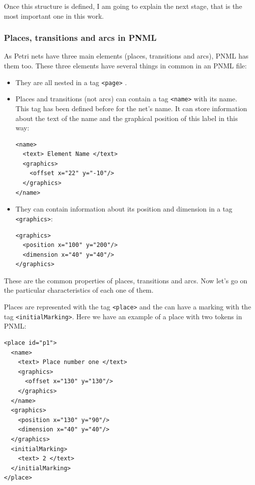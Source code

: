 Once this structure is defined, I am going to explain the next stage, that
is the most important one in this work. 

\subsubsection{Places, transitions and arcs in PNML}

As Petri nets have three main elements (places, transitions
and arcs), PNML has them too. These three elements have several things in common in an PNML file:
\begin{itemize}
  \item They are all nested in a tag \texttt{<page>} .


  \item Places and transitions (not arcs) can contain a tag \texttt{<name>} with its name. This tag has been defined before for the net's name. It
can store information about the text of the name and the graphical position
of this label in this way:
\begin{lstlisting}
<name>
  <text> Element Name </text>
  <graphics>
    <offset x="22" y="-10"/>
  </graphics>
</name>
\end{lstlisting}
   \item They can contain information about its position and dimension in
a tag \texttt{<graphics>}:
\begin{lstlisting}
<graphics>
  <position x="100" y="200"/>
  <dimension x="40" y="40"/>
</graphics>
\end{lstlisting}
\end{itemize}


These are the common properties of places, transitions and arcs. Now let's
go on the particular characteristics of each one of them.

Places are represented with the tag \texttt{<place>} and the can have a marking with the tag \texttt{<initialMarking>}.
Here we have an example of a place with two tokens in PNML: 

\begin{lstlisting}[label=pmnl_place,caption=PNML representation
for places]
<place id="p1">
  <name>
    <text> Place number one </text>
    <graphics>
      <offset x="130" y="130"/>
    </graphics>
  </name>
  <graphics>
    <position x="130" y="90"/>
    <dimension x="40" y="40"/>
  </graphics>
  <initialMarking>
    <text> 2 </text>
  </initialMarking>
</place>
\end{lstlisting}

